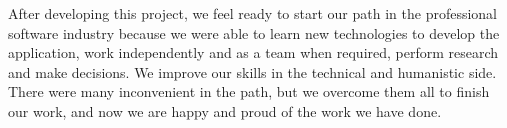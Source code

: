 After developing this project, we feel ready to start our path in the professional software industry because we were able to learn new technologies to develop the application, work independently and as a team when required, perform research and make decisions. We improve our skills in the technical and humanistic side. There were many inconvenient in the path, but we overcome them all to finish our work, and now we are happy and proud of the work we have done. 